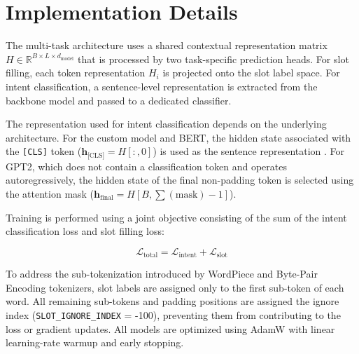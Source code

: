 \section{Implementation Details}
\label{sec:implementation_2}

The multi-task architecture uses a shared contextual representation matrix $H \in \mathbb{R}^{B \times L \times d_{\text{model}}}$ that is processed by two task-specific prediction heads. For slot filling, each token representation $H_i$ is projected onto the slot label space. For intent classification, a sentence-level representation is extracted from the backbone model and passed to a dedicated classifier.

The representation used for intent classification depends on the underlying architecture. For the custom model and BERT, the hidden state associated with the \texttt{[CLS]} token ($\mathbf{h}_{\text{[CLS]}} = H[:,0]$) is used as the sentence representation \cite{devlin2019bert}. For GPT2, which does not contain a classification token and operates autoregressively, the hidden state of the final non-padding token is selected using the attention mask ($\mathbf{h}_{\text{final}} = H[B,\sum(\text{mask})-1]$).

Training is performed using a joint objective consisting of the sum of the intent classification loss and slot filling loss:

\begin{equation}
\mathcal{L}_{\text{total}} = \mathcal{L}_{\text{intent}} + \mathcal{L}_{\text{slot}}
\end{equation}

To address the sub-tokenization introduced by WordPiece and Byte-Pair Encoding tokenizers, slot labels are assigned only to the first sub-token of each word. All remaining sub-tokens and padding positions are assigned the ignore index (\texttt{SLOT\_IGNORE\_INDEX} = -100), preventing them from contributing to the loss or gradient updates. All models are optimized using AdamW \cite{loshchilov2017decoupled} with linear learning-rate warmup and early stopping.